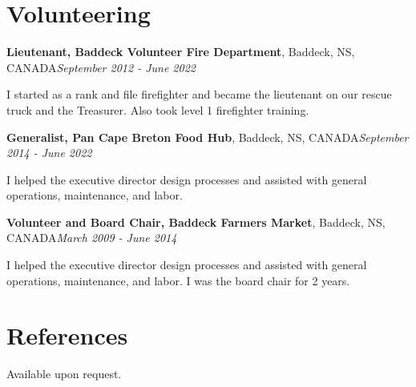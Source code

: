 \documentclass[letter,11pt]{article}
\newenvironment{noindentblock}{%
  \begin{list}{}{%
    \setlength{\leftmargin}{.25in} %
    \setlength{\rightmargin}{0in} %
    \setlength{\topsep}{0pt} %
    \setlength{\parsep}{0pt} %
  }
  \item[]}{\end{list}}
\begin{document}
\pagebreak
\section*{Volunteering}
\noindent
\textbf{Lieutenant, Baddeck Volunteer Fire Department}, Baddeck, NS, CANADA\hfill \textit{September 2012 - June 2022}
\begin{noindentblock}
  I started as a rank and file firefighter and became the lieutenant on our rescue truck and the Treasurer. Also took level 1 firefighter training.
\end{noindentblock}

\noindent
\textbf{Generalist, Pan Cape Breton Food Hub}, Baddeck, NS, CANADA\hfill \textit{September 2014 - June 2022}
\begin{noindentblock}
  I helped the executive director design processes and assisted with general operations, maintenance, and labor.
\end{noindentblock}

\noindent
\textbf{Volunteer and Board Chair, Baddeck Farmers Market}, Baddeck, NS, CANADA\hfill \textit{March 2009 - June 2014}
\begin{noindentblock}
  I helped the executive director design processes and assisted with general operations, maintenance, and labor. I was the board chair for 2 years.
\end{noindentblock}


\section*{References}
Available upon request.
\end{document}
